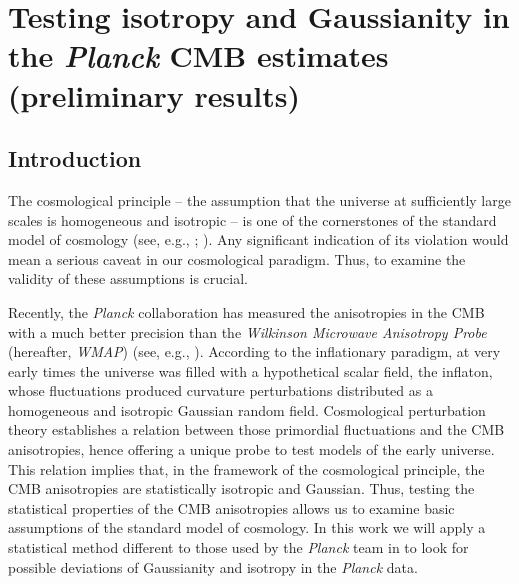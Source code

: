 \chapter{Testing isotropy and Gaussianity in the \textit{Planck} CMB estimates (preliminary results)}
\label{chapter-vsk}

\section{Introduction} 

The cosmological principle -- the assumption that the universe at sufficiently large scales is homogeneous and isotropic -- is one of the cornerstones of the standard model of cosmology (see, e.g., \cite{Robertson:1935zz}; \cite{Walker1937}). Any significant indication of its violation would mean a serious caveat in our cosmological paradigm. Thus, to examine the validity of these assumptions is crucial. 

Recently, the \textit{Planck} collaboration has measured the anisotropies in the CMB with a much better precision than the \textit{Wilkinson Microwave Anisotropy Probe} (hereafter, \textit{WMAP}) (see, e.g., \cite{Spergel:2003cb}). According to the inflationary paradigm, at very early times the universe was filled with a hypothetical scalar field, the inflaton, whose fluctuations produced curvature perturbations distributed as a homogeneous and isotropic Gaussian random field. Cosmological perturbation theory establishes a relation between those primordial fluctuations and the CMB anisotropies, hence offering a unique probe to test models of the early universe. This relation implies that, in the framework of the cosmological principle, the CMB anisotropies are  statistically isotropic and Gaussian. Thus, testing the statistical properties of the CMB anisotropies allows us to examine  basic assumptions of the standard model of cosmology. In this work we will apply a statistical method different to those used by the \textit{Planck} team in \cite{Ade:2013nlj} to look for possible deviations of Gaussianity and isotropy in the \textit{Planck} data.

